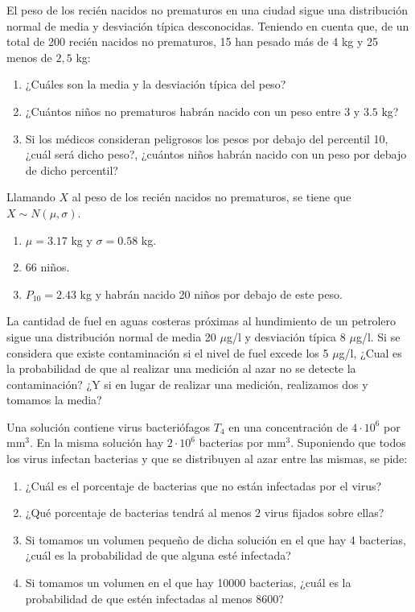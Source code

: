 {El peso de los recién nacidos no prematuros en una ciudad sigue una distribución normal de media y desviación típica
desconocidas.
Teniendo en cuenta que, de un total de 200 recién nacidos no prematuros, 15 han pesado más de 4 kg y 25 menos de $2,5$
kg:
\begin{enumerate}
\item ¿Cuáles son la media y la desviación típica del peso?
\item ¿Cuántos niños no prematuros habrán nacido con un peso entre $3$ y $3.5$ kg?
\item Si los médicos consideran peligrosos los pesos por debajo del percentil 10, ¿cuál será dicho peso?, ¿cuántos
niños habrán nacido con un peso por debajo de dicho percentil?
\end{enumerate}
}
{Llamando $X$ al peso de los recién nacidos no prematuros, se tiene que $X\sim N(\mu,\sigma)$.
\begin{enumerate}
\item $\mu=3.17$ kg y $\sigma=0.58$ kg.
\item 66 niños.
\item $P_{10}=2.43$ kg y habrán nacido 20 niños por debajo de este peso.
\end{enumerate}
}
{}


{La cantidad de fuel en aguas costeras próximas al hundimiento de un petrolero sigue una distribución normal de media 20 $\mu$g/l y desviación típica 8 $\mu$g/l. Si se considera que existe contaminación si el nivel de fuel excede los 5 $\mu$g/l, ¿Cual es la probabilidad de que al realizar una medición al azar no se detecte la contaminación? ¿Y si en lugar de realizar una medición, realizamos dos y tomamos la media?
}
{}
{}


{Una solución contiene virus bacteriófagos $T_4$ en una concentración de $4\cdot10^6$ por mm$^3$.
En la misma solución hay $2\cdot10^6$ bacterias por mm$^3$.
Suponiendo que todos los virus infectan bacterias y que se distribuyen al azar entre las mismas, se pide:
\begin{enumerate}
\item ¿Cuál es el porcentaje de bacterias que no están infectadas por el virus?
\item ¿Qué porcentaje de bacterias tendrá al menos 2 virus fijados sobre ellas?
\item Si tomamos un volumen pequeño de dicha solución en el que hay 4 bacterias, ¿cuál es la probabilidad de que alguna
esté infectada?
\item Si tomamos un volumen en el que hay 10000 bacterias, ¿cuál es la probabilidad de que estén infectadas al menos 8600?
\end{enumerate}
}
{}
{}


